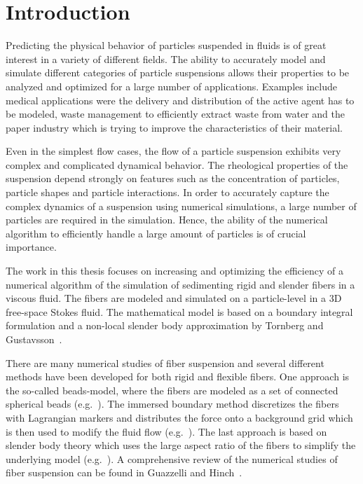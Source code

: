 \chapter{Introduction}

Predicting the physical behavior of particles suspended in fluids is of great interest in a variety of different fields. The ability to accurately model and simulate different categories of particle suspensions allows their properties to be analyzed and optimized for a large number of applications. Examples include medical applications were the delivery and distribution of the active agent has to be modeled, waste management to efficiently extract waste from water and the paper industry which is trying to improve the characteristics of their material.

Even in the simplest flow cases, the flow of a particle suspension exhibits very complex and complicated dynamical behavior. The rheological properties of the suspension depend strongly on features such as the concentration of particles, particle shapes and particle interactions. In order to accurately capture the complex dynamics of a suspension using numerical simulations, a large number of particles are required in the simulation. Hence, the ability of the numerical algorithm to efficiently handle a large amount of particles is of crucial importance.

The work in this thesis focuses on increasing and optimizing the efficiency of a numerical algorithm of the simulation of sedimenting rigid and slender fibers in a viscous fluid. The fibers are modeled and simulated on a particle-level in a 3D free-space Stokes fluid. The mathematical model is based on a boundary integral formulation and a non-local slender body approximation by Tornberg and Gustavsson~\cite{Tornberg2006}.

There are many numerical studies of fiber suspension and several different methods have been developed for both rigid and flexible fibers. One approach is the so-called beads-model, where the fibers are modeled as a set of connected spherical beads (e.g.~\cite{Fan1998}\cite{Joung2001}\cite{Skjetne1997}\cite{Yamamoto1995}). The immersed boundary method discretizes the fibers with Lagrangian markers and distributes the force onto a background grid which is then used to modify the fluid flow (e.g.~\cite{Peskin2002}\cite{Stockie1998}). The last approach is based on slender body theory which uses the large aspect ratio of the fibers to simplify the underlying model (e.g.~\cite{Gustavsson2009}\cite{Tornberg2006}\cite{Tornberg2004}). A comprehensive review of the numerical studies of fiber suspension can be found in Guazzelli and Hinch~\cite{Guazzelli2011}.

